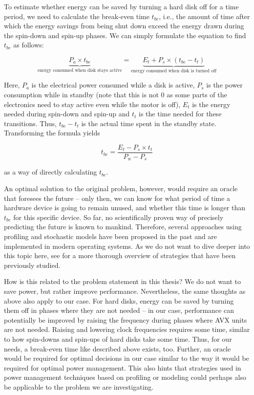 {To estimate whether energy can be saved by turning a hard disk off for a time period, we need to calculate the break-even time $t_{be}$, i.e., the amount of time after which the energy savings from being shut down exceed the energy drawn during the spin-down and spin-up phases. We can simply formulate the equation to find $t_{be}$ as follows:

\begin{displaymath}
\underbrace{P_a \times t_{be}}_{\text{energy consumed when disk stays active}} = \underbrace{E_t + P_s \times (t_{be} - t_t)}_{\text{energy consumed when disk is turned off}}
\end{displaymath}

Here, $P_a$ is the electrical power consumed while a disk is active, $P_s$ is the power consumption while in standby (note that this is not $0$ as some parts of the electronics need to stay active even while the motor is off), $E_t$ is the energy needed during spin-down and spin-up and $t_t$ is the time needed for these transitions. Thus, $t_{be} - t_t$ is the actual time spent in the standby state. Transforming the formula yields

\begin{displaymath}
t_{be} = \frac{E_t - P_s \times t_t}{P_w - P_s}
\end{displaymath}

\noindent as a way of directly calculating $t_{be}$.

An optimal solution to the original problem, however, would require an oracle that foresees the future -- only then, we can know for what period of time a hardware device is going to remain unused, and whether this time is longer than $t_{be}$ for this specific device. So far, no scientifically proven way of precisely predicting the future is known to mankind. Therefore, several approaches using profiling and stochastic models have been proposed in the past and are implemented in modern operating systems. As we do not want to dive deeper into this topic here, see \citeauthor{lu2001comparing} \cite{lu2001comparing} for a more thorough overview of strategies that have been previously studied.

How is this related to the problem statement in this thesis? We do not want to save power, but rather improve performance. Nevertheless, the same thoughts as above also apply to our case. For hard disks, energy can be saved by turning them off in phases where they are not needed -- in our case, performance can potentially be improved by raising the frequency during phases where \gls{AVX} units are not needed. Raising and lowering clock frequencies requires some time, similar to how spin-downs and spin-ups of hard disks take some time. Thus, for our needs, a break-even time like described above exists, too. Further, an oracle would be required for optimal decisions in our case similar to the way it would be required for optimal power management. This also hints that strategies used in power management techniques based on profiling or modeling could perhaps also be applicable to the problem we are investigating.

}
